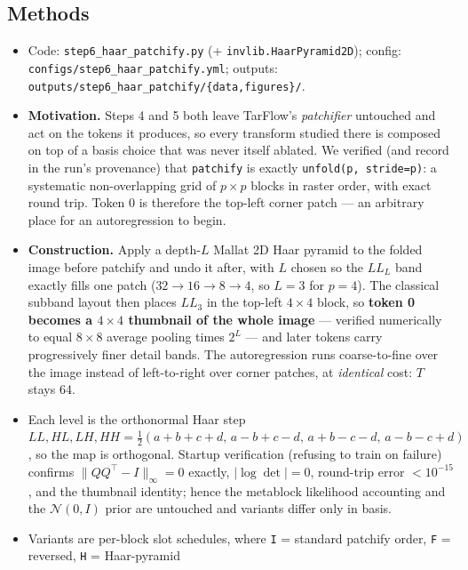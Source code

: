 \documentclass[11pt]{article}
\begin{document}
\subsection{Methods}
\begin{itemize}
  \item Code: \texttt{step6\_haar\_patchify.py} (+
        \texttt{invlib.HaarPyramid2D}); config:
        \texttt{configs/step6\_haar\_patchify.yml}; outputs:
        \texttt{outputs/step6\_haar\_patchify/\{data,figures\}/}.
  \item \textbf{Motivation.} Steps 4 and 5 both leave TarFlow's
        \emph{patchifier} untouched and act on the tokens it produces, so
        every transform studied there is composed on top of a basis choice
        that was never itself ablated. We verified (and record in the run's
        provenance) that \texttt{patchify} is exactly
        \texttt{unfold(p, stride=p)}: a systematic non-overlapping grid of
        $p \times p$ blocks in raster order, with exact round trip. Token 0
        is therefore the top-left corner patch --- an arbitrary place for an
        autoregression to begin.
  \item \textbf{Construction.} Apply a depth-$L$ Mallat 2D Haar pyramid to the
        folded image before patchify and undo it after, with $L$ chosen so the
        $LL_L$ band exactly fills one patch ($32 \to 16 \to 8 \to 4$, so
        $L=3$ for $p=4$). The classical subband layout then places $LL_3$ in
        the top-left $4\times4$ block, so \textbf{token 0 becomes a $4\times4$
        thumbnail of the whole image} --- verified numerically to equal
        $8\times8$ average pooling times $2^L$ --- and later tokens carry
        progressively finer detail bands. The autoregression runs
        coarse-to-fine over the image instead of left-to-right over corner
        patches, at \emph{identical} cost: $T$ stays 64.
  \item Each level is the orthonormal Haar step
        $LL,HL,LH,HH = \frac{1}{2}(a{+}b{+}c{+}d,\, a{-}b{+}c{-}d,\,
        a{+}b{-}c{-}d,\, a{-}b{-}c{+}d)$, so the map is orthogonal. Startup
        verification (refusing to train on failure) confirms
        $\|QQ^\top - I\|_\infty = 0$ exactly, $|\log\det| = 0$, round-trip
        error $<10^{-15}$, and the thumbnail identity; hence the metablock
        likelihood accounting and the $\mathcal{N}(0,I)$ prior are untouched
        and variants differ only in basis.
  \item Variants are per-block slot schedules, where \texttt{I} = standard
        patchify order, \texttt{F} = reversed, \texttt{H} = Haar-pyramid

\end{itemize}
\end{document}
